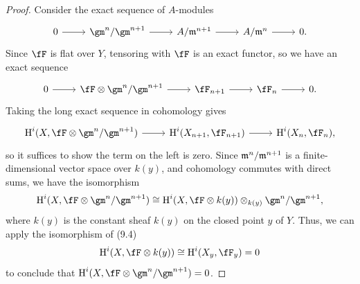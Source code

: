 \documentclass[a4paper]{article}
\begin{document}
\begin{enumerate} [label=\textbf{\arabic*.}, leftmargin=0em]
\begin{proof}
              Consider the exact sequence of $A$-modules
              \[ \begin{tikzcd}
                      0 \arrow[r] & \gm^n/\gm^{n + 1} \arrow[r] & A/\goth{m}^{n + 1} \arrow[r] & A/\goth{m}^n \arrow[r] & 0.
                  \end{tikzcd} \]
              Since $\fF$ is flat over $Y$, tensoring with $\fF$ is an exact functor, so we have an exact sequence
              \[ \begin{tikzcd}
                      0 \arrow[r] & \fF \otimes \gm^n/\gm^{n + 1} \arrow[r] & \fF_{n + 1} \arrow[r] & \fF_n \arrow[r] & 0.
                  \end{tikzcd} \]
              Taking the long exact sequence in cohomology gives
              \[ \begin{tikzcd}
                      \cH^i(X, \fF \otimes \gm^n/\gm^{n + 1}) \arrow[r] & \cH^i(X_{n + 1}, \fF_{n + 1}) \arrow[r] & \cH^i(X_{n}, \fF_{n}),
                  \end{tikzcd} \]
              so it suffices to show the term on the left is zero.
              Since $\mathfrak{m}^n / \mathfrak{m}^{n + 1}$ is a finite-dimensional vector space over $k(y)$, and cohomology commutes with direct sums, we have the isomorphism
              \begin{equation*}
                  \cH^i(X, \fF \otimes \gm^n / \gm^{n + 1}) \cong \cH^i(X, \fF \otimes k(y)) \otimes_{k(y)} \gm^n/\gm^{n + 1},
              \end{equation*}
              where $k(y)$ is the constant sheaf $k(y)$ on the closed point $y$ of $Y$.
              Thus, we can apply the isomorphism of (9.4)
              \begin{equation*}
                  \cH^i(X, \fF \otimes k(y)) \cong \cH^i(X_y, \fF_y) = 0
              \end{equation*}
              to conclude that $\cH^i(X, \fF \otimes \gm^n / \gm^{n + 1}) = 0$.


          \end{proof}

\end{enumerate}
\end{document}
